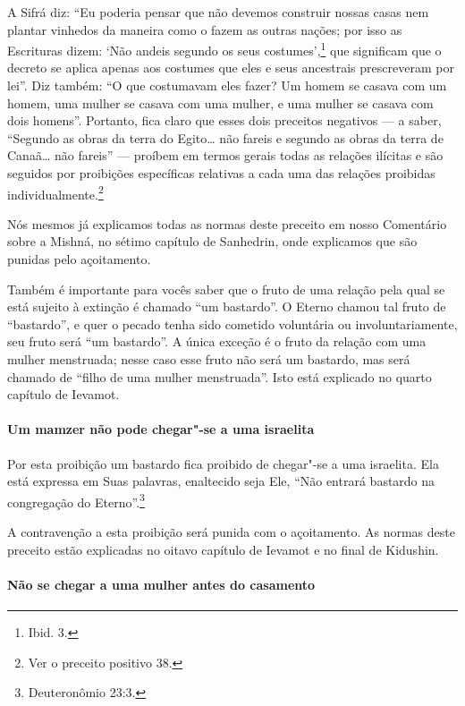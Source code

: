 \begin{multicols}{2}
A Sifrá\starr{} diz: ``Eu poderia pensar que não devemos construir nossas casas
nem plantar vinhedos da maneira como o fazem as outras nações; por isso
as Escrituras dizem: `Não andeis segundo os seus costumes',\footnote{Ibid. 3.}
que significam que o decreto se aplica apenas aos costumes que eles e
seus ancestrais prescreveram por lei''. Diz também: ``O que costumavam
eles fazer? Um homem se casava com um homem, uma mulher se casava com
uma mulher, e uma mulher se casava com dois homens''. Portanto, fica
claro que esses dois preceitos negativos --- a saber, ``Segundo as obras
da terra do Egito\ldots{} não fareis e segundo as obras da terra de Canaã\ldots{} não fareis'' --- proíbem em termos gerais todas as relações ilícitas
e são seguidos por proibições específicas relativas a cada uma das
relações proibidas individualmente.\footnote{Ver o preceito positivo 38.}

Nós mesmos já explicamos todas as normas deste preceito em nosso
Comentário sobre a Mishná\starr, no sétimo capítulo de Sanhedrin\starr, onde
explicamos que são punidas pelo açoitamento.

Também é importante para vocês saber que o fruto de uma relação pela
qual se está sujeito à extinção é chamado ``um bastardo''. O Eterno
chamou tal fruto de ``bastardo'', e quer o pecado tenha sido cometido
voluntária ou involuntariamente, seu fruto será ``um bastardo''. A única
exceção é o fruto da relação com uma mulher menstruada; nesse caso esse
fruto não será um bastardo, mas será chamado de ``filho de uma mulher
menstruada''. Isto está explicado no quarto capítulo de Ievamot\starr.

\paragraph{Um mamzer\starr{} não pode chegar"-se a uma israelita}

Por esta proibição um bastardo fica proibido de chegar"-se a uma
israelita. Ela está expressa em Suas palavras, enaltecido seja Ele,
``Não entrará bastardo na congregação do Eterno''.\footnote{Deuteronômio 23:3.}

A contravenção a esta proibição será punida com o açoitamento. As normas
deste preceito estão explicadas no oitavo capítulo de Ievamot\starr{} e no
final de Kidushin\starr.

\paragraph{Não se chegar a uma mulher antes do casamento}


\end{multicols}
